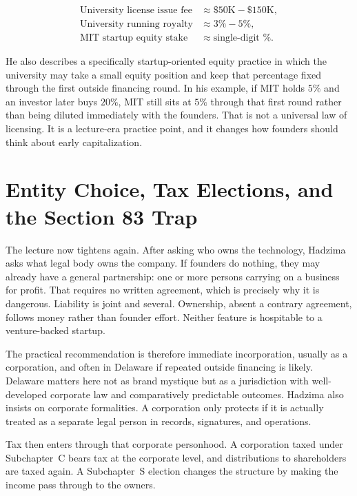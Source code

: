 \begin{align}
\text{University license issue fee} &\approx \$50\text{K}-\$150\text{K},\\
\text{University running royalty} &\approx 3\%-5\%,\\
\text{MIT startup equity stake} &\approx \text{single-digit }\%.
\end{align}

He also describes a specifically startup-oriented equity practice in which the university may take a small equity position and keep that percentage fixed through the first outside financing round. In his example, if MIT holds \(5\%\) and an investor later buys \(20\%\), MIT still sits at \(5\%\) through that first round rather than being diluted immediately with the founders. That is not a universal law of licensing. It is a lecture-era practice point, and it changes how founders should think about early capitalization.

\section{Entity Choice, Tax Elections, and the Section 83 Trap}

The lecture now tightens again. After asking who owns the technology, Hadzima asks what legal body owns the company. If founders do nothing, they may already have a general partnership: one or more persons carrying on a business for profit. That requires no written agreement, which is precisely why it is dangerous. Liability is joint and several. Ownership, absent a contrary agreement, follows money rather than founder effort. Neither feature is hospitable to a venture-backed startup.

The practical recommendation is therefore immediate incorporation, usually as a corporation, and often in Delaware if repeated outside financing is likely. Delaware matters here not as brand mystique but as a jurisdiction with well-developed corporate law and comparatively predictable outcomes. Hadzima also insists on corporate formalities. A corporation only protects if it is actually treated as a separate legal person in records, signatures, and operations.

Tax then enters through that corporate personhood. A corporation taxed under Subchapter~C bears tax at the corporate level, and distributions to shareholders are taxed again. A Subchapter~S election changes the structure by making the income pass through to the owners.

